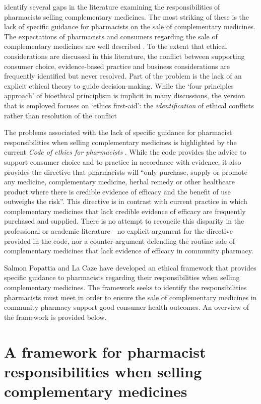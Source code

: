 \documentclass[11pt,a4paper]{article}
\begin{document}
\textcite{SalmanPopattia2018} identify several gaps in the literature
examining the responsibilities of pharmacists selling complementary
medicines. The most striking of these is the lack of specific guidance
for pharmacists on the sale of complementary medicines. The expectations
of pharmacists and consumers regarding the sale of complementary
medicines are well described
\autocites{Iyer2016a}{Tran:2013kh}{Kanjanarach2011}. To the extent that
ethical considerations are discussed in this literature, the conflict
between supporting consumer choice, evidence-based practice and business
considerations are frequently identified but never resolved. Part of the
problem is the lack of an explicit ethical theory to guide
decision-making. While the `four principles approach' of bioethical
principlism is implicit in many discussions, the version that is
employed focuses on `ethics first-aid': the \emph{identification} of
ethical conflicts rather than resolution of the conflict
\autocites{Beauchamp2012}{Pullman2005}

The problems associated with the lack of specific guidance for
pharmacist responsibilities when selling complementary medicines is
highlighted by the current \emph{Code of ethics for pharmacists}
\autocite{PSA2017}. While the code provides the advice to support
consumer choice and to practice in accordance with evidence, it also
provides the directive that pharmacists will ``only purchase, supply or
promote any medicine, complementary medicine, herbal remedy or other
healthcare product where there is credible evidence of efficacy and the
benefit of use outweighs the risk''. This directive is in contrast with
current practice in which complementary medicines that lack credible
evidence of efficacy are frequently purchased and supplied. There is no
attempt to reconcile this disparity in the professional or academic
literature---no explicit argument for the directive provided in the
code, nor a counter-argument defending the routine sale of complementary
medicines that lack evidence of efficacy in community pharmacy.

Salmon Popattia and La Caze have developed an ethical framework that
provides specific guidance to pharmacists regarding their
responsibilities when selling complementary medicines. The framework
seeks to identify the responsibilities pharmacists must meet in order to
ensure the sale of complementary medicines in community pharmacy support
good consumer health outcomes. An overview of the framework is provided
below.

\section{A framework for pharmacist responsibilities when selling
complementary
medicines}\label{a-framework-for-pharmacist-responsibilities-when-selling-complementary-medicines}
\end{document}
